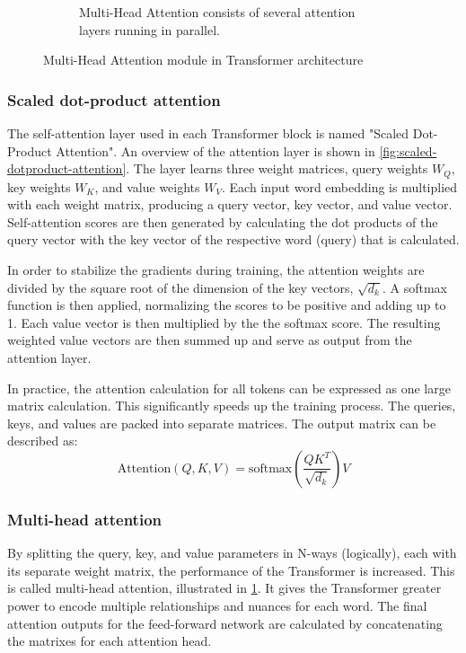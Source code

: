 \begin{figure}[htp]
\begin{subfigure}[b]{0.5\textwidth}
        \caption{Multi-Head Attention consists of several attention layers running in parallel.}
        \label{fig:multihead-attention}
    \end{subfigure}%
    \caption{Multi-Head Attention module in Transformer architecture \textcite{vaswani2017attention}}
    \label{fig:transformer-architecture-details}
\end{figure}

\subsubsection{Scaled dot-product attention} 
\label{sec:scaled-dot-product-attention}
The self-attention layer used in each Transformer block is named "Scaled Dot-Product Attention". An overview of the attention layer is shown in \cref{fig:scaled-dotproduct-attention}. The layer learns three weight matrices, query weights \(W_Q\), key weights \(W_K\), and value weights \(W_V\). Each input word embedding is multiplied with each weight matrix, producing a query vector, key vector, and value vector. Self-attention scores are then generated by calculating the dot products of the query vector with the key vector of the respective word (query) that is calculated.

In order to stabilize the gradients during training, the attention weights are divided by the square root of the dimension of the key vectors, \(\sqrt{d_{k}}\). A softmax function is then applied, normalizing the scores to be positive and adding up to 1. Each value vector is then multiplied by the the softmax score. The resulting weighted value vectors are then summed up and serve as output from the attention layer.

In practice, the attention calculation for all tokens can be expressed as one large matrix calculation. This significantly speeds up the training process. The queries, keys, and values are packed into separate matrices. The output matrix can be described as:
\begin{equation}
    \text{Attention$(Q,K,V)$} = \text{softmax}(\frac{QK^T}{\sqrt{d_{k}}})V
\end{equation}


\subsubsection{Multi-head attention}
\label{sec:multi-head-attention}
By splitting the query, key, and value parameters in N-ways (logically), each with its separate weight matrix, the performance of the Transformer is increased. This is called multi-head attention, illustrated in \cref{fig:multihead-attention}. It gives the Transformer greater power to encode multiple relationships and nuances for each word. The final attention outputs for the feed-forward network are calculated by concatenating the matrixes for each attention head.

